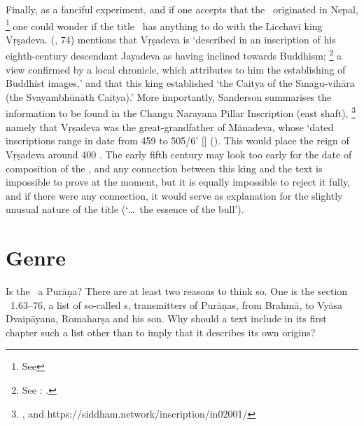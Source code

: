 Finally, as a fanciful experiment, and if one accepts 
that the \VSS\ originated in Nepal,%
		\footnote{See  \CHECK} 
one could wonder if the title \Vss\ 
has anything to do with the Licchavī king Vṛṣadeva.
\citeauthor{SandersonSaivaAge} 
(\citeyear{SandersonSaivaAge}, 74) mentions that  
Vṛṣadeva is `described in an inscription of his eighth-century 
descendant Jayadeva as having inclined towards Buddhism;%
			 \footnote{See : 
					.}
a view conﬁrmed by a local chronicle, which attributes to
him the establishing of Buddhist images,'
and that this king established 
`the Caitya of the Sı̄nagu-vihāra (the Svayambhūnāth Caitya).'
More importantly, Sanderson summarises the 
information to be found in the 
Changu Narayana Pillar Inscription (east shaft),%
		\footnote{,  and 
		https://siddham.network/inscription/in02001/} 
namely that Vṛṣadeva was the great-grandfather of Mānadeva, whose
`dated inscriptions range in date from 459 to 505/6' [\CE]
().
This would place 
the reign of Vṛṣadeva around 400 \CE. 
The early fifth century may look too early for the date of composition
of the \Vss, and any connection between this king
and the text is impossible to prove at the moment, 
but it is equally impossible to reject it fully, 
and if there were any connection, 
it would serve as explanation for the slightly
unusual nature of the title (`\dots\ the essence of the bull').
\hide{
}

%
%
\section{Genre}

Is the \VSS\ a Purāṇa? There are at least two reasons to think so.
One is the section \VSS\ 1.63--76, a list of so-called s, 
transmitters of Purāṇas, from Brahmā, to Vyāsa Dvaipāyana, Romaharṣa and 
his son. Why should a text include in its first chapter such a list other than to imply that it describes its own origins?

